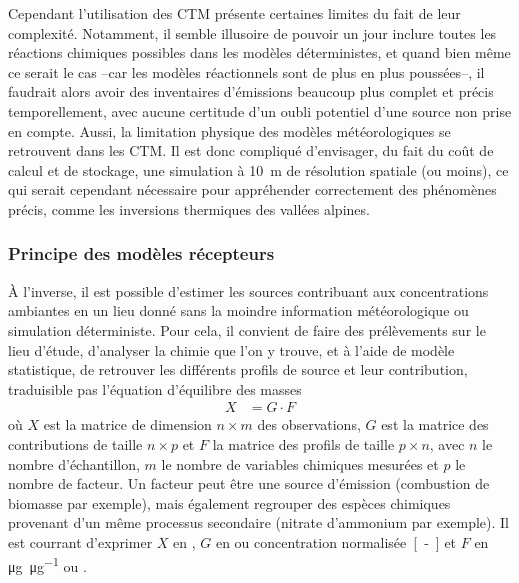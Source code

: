 Cependant l'utilisation des CTM présente certaines limites du fait de leur complexité.
Notamment, il semble illusoire de pouvoir un jour inclure toutes les réactions chimiques
possibles dans les modèles déterministes, et quand bien même ce serait le cas --car les
modèles réactionnels sont de plus en plus poussées--, il faudrait alors avoir des
inventaires d'émissions beaucoup plus complet et précis temporellement, avec aucune
certitude d'un oubli potentiel d'une source non prise en compte.  Aussi, la limitation
physique des modèles météorologiques se retrouvent dans les CTM. Il est donc compliqué
d'envisager, du fait du coût de calcul et de stockage, une simulation à \SI{10}{m} de
résolution spatiale (ou moins), ce qui serait cependant nécessaire pour appréhender
correctement des phénomènes précis, comme les inversions thermiques des vallées alpines.

\subsubsection{Principe des modèles récepteurs}%
\label{ssub:model_recepteur}

À l'inverse, il est possible d'estimer les sources contribuant aux concentrations
ambiantes en un lieu donné sans la moindre information météorologique ou simulation
déterministe. Pour cela, il convient de faire des prélèvements sur le lieu d'étude,
d'analyser la chimie que l'on y trouve, et à l'aide de modèle statistique, de retrouver
les différents profils de source et leur contribution, traduisible pas l'équation
d'équilibre des masses
\begin{align}
    \label{eq:mass_balance}
    X &= G \cdot F
\end{align}
où $X$ est la matrice de dimension $n\times m$ des observations, $G$ est la matrice des
contributions de taille $n\times p$ et $F$ la matrice des profils de taille $p \times n$,
avec $n$ le nombre d'échantillon, $m$ le nombre de variables chimiques mesurées et $p$ le
nombre de facteur. Un facteur peut être une source d'émission (combustion de biomasse par
exemple), mais également regrouper des espèces chimiques provenant d'un même processus
secondaire (nitrate d'ammonium par exemple).
Il est courrant d'exprimer $X$ en \si{\ugm}, $G$ en \si{\ugm} ou concentration
normalisée~\si{[-]} et $F$ en \si{\micro\g\per\micro\g} ou \si{\ugm}.

